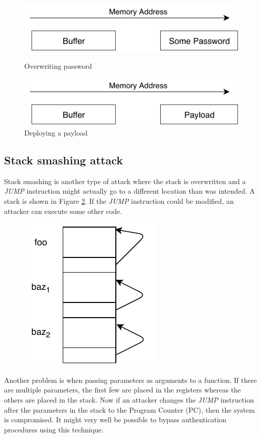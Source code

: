 \documentclass[twoside]{article}
\begin{document}
\begin{figure}[ht]
	\centering
	\begin{minipage}{0.45\textwidth}
		\centering
		\includegraphics[width=0.8\linewidth]{buffer1} %
		\caption{Overwriting password}
		\label{fig:buffer1}
	\end{minipage}\hfill
	\begin{minipage}{0.45\textwidth}
		\centering
		\includegraphics[width=0.8\linewidth]{buffer2} %
		\caption{Deploying a payload}
		\label{fig:buffer2}
	\end{minipage}
\end{figure}

\subsection{Stack smashing attack}
Stack smashing is another type of attack where the stack is overwritten and a \textit{JUMP} instruction might actually go to a different location than was intended. A stack is shown in Figure \ref{fig:stack}. If the \textit{JUMP} instruction could be modified, an attacker can execute some other code.
\begin{figure}[h]
\centering
\includegraphics[width=0.25\linewidth]{stack}
\caption{}
\label{fig:stack}
\end{figure}

Another problem is when passing parameters as arguments to a function. If there are multiple parameters, the first few are placed in the registers whereas the others are placed in the stack. Now if an attacker changes the \textit{JUMP} instruction after the parameters in the stack to the Program Counter (PC), then the system is compromised. It might very well be possible to bypass authentication procedures using this technique. 
\end{document}
